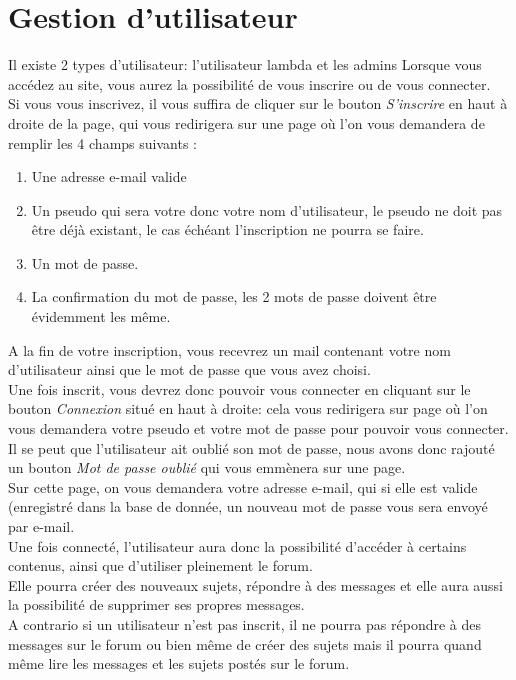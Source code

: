 \documentclass[a4paper, 11pt]{article}
\begin{document}
\section{Gestion d'utilisateur}
Il existe 2 types d'utilisateur: l'utilisateur lambda et les admins
Lorsque vous accédez au site, vous aurez la possibilité de vous inscrire ou de vous connecter.\\
Si vous vous inscrivez, il vous suffira de cliquer sur le bouton \textit{S'inscrire} en haut à droite de la page, qui vous redirigera sur une page où l'on
vous demandera de remplir les 4 champs suivants :
\begin{enumerate}
\item Une adresse e-mail valide
\item Un pseudo qui sera votre donc votre nom d'utilisateur, le pseudo ne doit pas être déjà existant, le cas échéant l'inscription ne pourra se faire.
\item Un mot de passe.
\item La confirmation du mot de passe, les 2 mots de passe doivent être évidemment les même.
\end{enumerate}
A la fin de votre inscription, vous recevrez un mail contenant votre nom d'utilisateur ainsi que le mot de passe que vous avez choisi.\\
Une fois inscrit, vous devrez donc pouvoir vous connecter en cliquant sur le bouton \textit{Connexion} situé en haut à droite: cela vous redirigera sur page où l'on vous demandera votre pseudo et votre mot de passe pour pouvoir vous connecter.\\
Il se peut que l'utilisateur ait oublié son mot de passe, nous avons donc rajouté un bouton \textit{Mot de passe oublié} qui vous emmènera sur une page.\\
Sur cette page, on vous demandera votre adresse e-mail, qui si elle est valide (enregistré dans la base de donnée, un nouveau mot de passe vous sera
envoyé par e-mail.\\
Une fois connecté, l'utilisateur aura donc la possibilité d'accéder à certains contenus, ainsi que d'utiliser pleinement le forum.\\
Elle pourra créer des nouveaux sujets, répondre à des messages et elle aura aussi la possibilité de supprimer ses propres messages.\\
A contrario si un utilisateur n'est pas inscrit, il ne pourra pas répondre à des messages sur le forum ou bien même de créer des sujets mais il pourra quand
même lire les messages et les sujets postés sur le forum.\\
\end{document}
